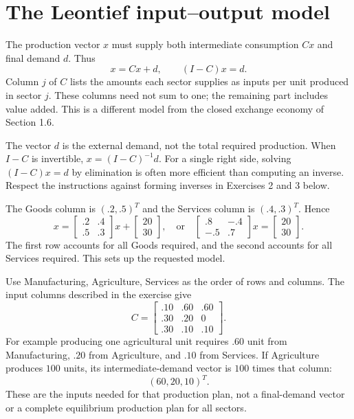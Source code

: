 \section{The Leontief input--output model}
The production vector $x$ must supply both intermediate consumption $Cx$
and final demand $d$. Thus
\[x=Cx+d,\qquad (I-C)x=d.\]
Column $j$ of $C$ lists the amounts each sector supplies as inputs per
unit produced in sector $j$. These columns need not sum to one; the
remaining part includes value added. This is a different model from the
closed exchange economy of Section 1.6.

The vector $d$ is the external demand, not the total required production.
When $I-C$ is invertible, $x=(I-C)^{-1}d$. For a single right side,
solving $(I-C)x=d$ by elimination is often more efficient than computing
an inverse. Respect the instructions against forming inverses in
Exercises 2 and 3 below.

The Goods column is $(.2,.5)^T$ and the Services column is $(.4,.3)^T$.
Hence
\[x=\begin{bmatrix}.2&.4\\.5&.3\end{bmatrix}x+
\begin{bmatrix}20\\30\end{bmatrix},\quad\text{or}\quad
\begin{bmatrix}.8&-.4\\-.5&.7\end{bmatrix}x=
\begin{bmatrix}20\\30\end{bmatrix}.\]
The first row accounts for all Goods required, and the second accounts
for all Services required. This sets up the requested model.

Use Manufacturing, Agriculture, Services as the order of rows and
columns. The input columns described in the exercise give
\[C=\begin{bmatrix}.10&.60&.60\\.30&.20&0\\.30&.10&.10\end{bmatrix}.\]
For example producing one agricultural unit requires $.60$ unit
from Manufacturing, $.20$ from Agriculture, and $.10$ from Services.
If Agriculture produces $100$ units, its intermediate-demand vector
is $100$ times that column:
\[(60,20,10)^T.\]
These are the inputs needed for that production plan, not a final-demand
vector or a complete equilibrium production plan for all sectors.


